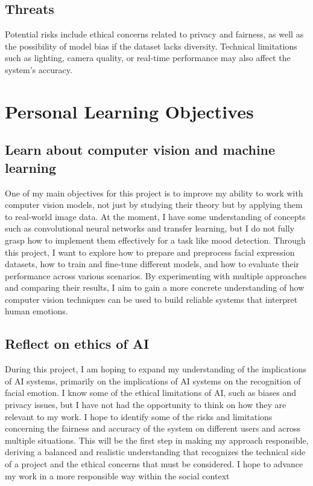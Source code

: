 \documentclass[12pt,a4paper]{article}
\begin{document}
\subsection*{Threats}
Potential risks include ethical concerns related to privacy and fairness, as well as the possibility of model bias if the dataset lacks diversity. Technical limitations such as lighting, camera quality, or real-time performance may also affect the system’s accuracy.




\section{Personal Learning Objectives}


\subsection{Learn about computer vision and machine learning}
One of my main objectives for this project is to improve my ability to work with computer vision models, not just by studying their theory but by applying them to real-world image data. At the moment, I have some understanding of concepts such as convolutional neural networks and transfer learning, but I do not fully grasp how to implement them effectively for a task like mood detection. Through this project, I want to explore how to prepare and preprocess facial expression datasets, how to train and fine-tune different models, and how to evaluate their performance across various scenarios. By experimenting with multiple approaches and comparing their results, I aim to gain a more concrete understanding of how computer vision techniques can be used to build reliable systems that interpret human emotions.

\subsection{Reflect on ethics of AI}
During this project, I am hoping to expand my understanding of the implications of AI systems, primarily on the implications of AI systems on the recognition of facial emotion. I know some of the ethical limitations of AI, such as biases and privacy issues, but I have not had the opportunity to think on how they are relevant to my work. I hope to identify some of the risks and limitations concerning the fairness and accuracy of the system on different users and across multiple situations. This will be the first step in making my approach responsible, deriving a balanced and realistic understanding that recognizes the technical side of a project and the ethical concerns that must be considered. I hope to advance my work in a more responsible way within the social context
\end{document}
